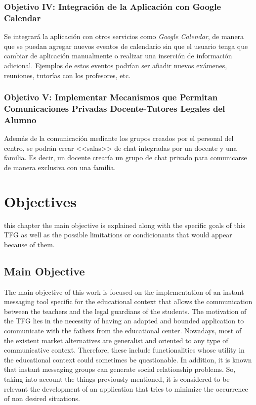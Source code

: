 \subsection{Objetivo IV: Integración de la Aplicación con Google Calendar}
Se integrará la aplicación con otros servicios como \textit{Google Calendar}, de manera que se puedan agregar nuevos eventos de calendario sin que el usuario tenga que cambiar de aplicación manualmente o realizar una inserción de información adicional. Ejemplos de estos eventos podrían ser añadir nuevos exámenes, reuniones, tutorías con los profesores, etc.

\subsection{Objetivo V: Implementar Mecanismos que Permitan Comunicaciones Privadas Docente-Tutores Legales del Alumno}
Además de la comunicación mediante los grupos creados por el personal del centro, se podrán crear <<salas>> de chat integradas por un docente y una familia. Es decir, un docente crearía un grupo de chat privado para comunicarse de manera exclusiva con una familia.


\chapter{Objectives}
 this chapter the main objective is explained along with the specific goals of this \acs{TFG} as well as the possible limitations or condicionants that would appear because of them.

\section{Main Objective}
The main objective of this work is focused on the implementation of an instant \mbox{messaging} tool specific for the educational context that allows the communication between the \mbox{teachers} and the legal guardians of the students. The motivation of the \acs{TFG} lies in the \mbox{necessity} of having an adapted and bounded application to communicate with the fathers from the \mbox{educational} center. Nowadays, most of the existent market alternatives are \mbox{generalist} and oriented to any type of communicative context. Therefore, these include functionalities \mbox{whose} utility in the educational context could sometimes be questionable. In addition, it is known that \mbox{instant} messaging groups can generate social relationship problems. So, taking into \mbox{account} the things \mbox{previously} mentioned, it is considered to be relevant the development of an application that tries to minimize the occurrence of non desired situations.

